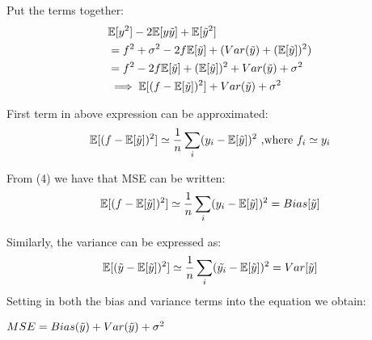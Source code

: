 %
Put the terms together:
\begin{align*}
    & \mathbb{E}[y^2]-2\mathbb{E}[y\Tilde{y}]+\mathbb{E}[\Tilde{y}^2]\\
    & = f^2+\sigma^2-2f\mathbb{E}[\Tilde{y}]+(Var(\Tilde{y})+(\mathbb{E}[\Tilde{y}])^2)\\
    & = f^2-2f\mathbb{E}[\Tilde{y}]+(\mathbb{E}[\Tilde{y}])^2+Var(\Tilde{y})+\sigma^2\\
    & \implies \mathbb{E}[(f-\mathbb{E}[\Tilde{y}])^2]+Var(\Tilde{y})+\sigma^2
\end{align*}

First term in above expression can be approximated:
\begin{equation}
    \mathbb{E}[(f-\mathbb{E}[\Tilde{y}])^2] \simeq \frac{1}{n}\sum_{i}(y_i-\mathbb{E}[\Tilde{y}])^2 \text{ ,where } f_i\simeq y_i
\end{equation}

From (4) we have that MSE can be written:
\begin{equation}
    \mathbb{E}[(f-\mathbb{E}[\Tilde{y}])^2] \simeq \frac{1}{n}\sum_{i}(y_i-\mathbb{E}[\Tilde{y}])^2 = Bias[\Tilde{y}]
\end{equation}

Similarly, the variance can be expressed as:
\begin{align*}
    \mathbb{E}[(\Tilde{y}-\mathbb{E}[\Tilde{y}])^2]\simeq\frac{1}{n}\sum_{i}(\Tilde{y_i}-\mathbb{E}[\Tilde{y}])^2 = Var[\Tilde{y}]
\end{align*}
Setting in both the bias and variance terms into the equation we obtain:

$MSE=Bias(\Tilde{y})+Var(\Tilde{y})+\sigma^2$
\hfill\break




